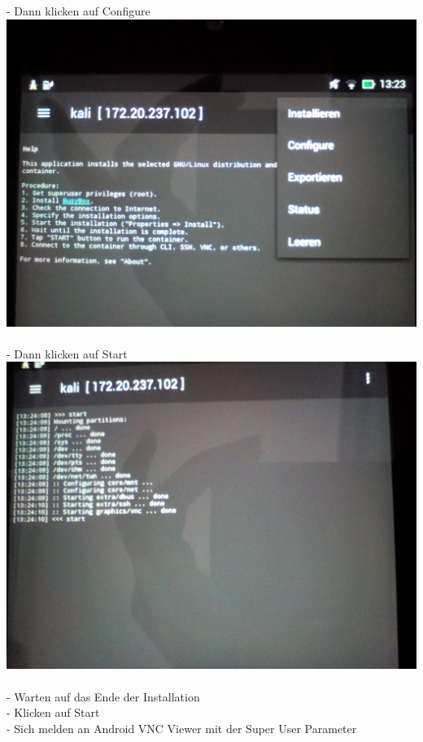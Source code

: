 \documentclass[11pt,a4paper]{article}
\begin{document}
- Dann klicken auf Configure \\
\includegraphics[scale=0.09]{./Image/img5} \\ \\
- Dann klicken auf Start \\
\includegraphics[scale=0.09]{./Image/img6} \\ \\
- Warten auf das Ende der Installation \\
- Klicken auf Start \\
- Sich melden an Android VNC Viewer mit der Super User Parameter \\
\end{document}
